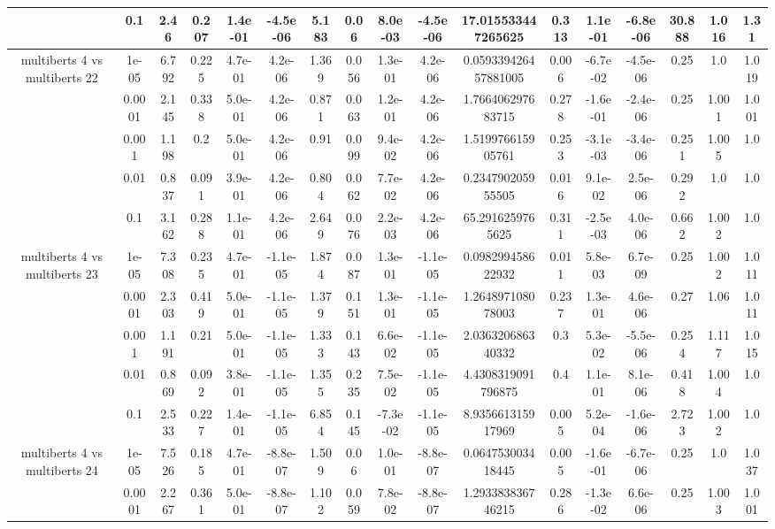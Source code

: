 \begin{tabular}{|c|c|c|c|c|c|c|c|c|c|c|c|c|c|c|c|c|}
 & 0.1 & 2.46 & 0.207 & 1.4e-01 & -4.5e-06 & 5.183 & 0.06 & 8.0e-03 & -4.5e-06 & 17.015533447265625 & 0.313 & 1.1e-01 & -6.8e-06 & 30.888 & 1.016 & 1.31 \\
\hline
\multirow{5}{*}{multiberts 4 vs multiberts 22} & 1e-05 & 6.792 & 0.225 & 4.7e-01 & 4.2e-06 & 1.369 & 0.056 & 1.3e-01 & 4.2e-06 & 0.059339426457881005 & 0.006 & -6.7e-02 & -4.5e-06 & 0.25 & 1.0 & 1.019 \\
 & 0.0001 & 2.145 & 0.338 & 5.0e-01 & 4.2e-06 & 0.871 & 0.063 & 1.2e-01 & 4.2e-06 & 1.766406297683715 & 0.278 & -1.6e-01 & -2.4e-06 & 0.25 & 1.001 & 1.001 \\
 & 0.001 & 1.198 & 0.2 & 5.0e-01 & 4.2e-06 & 0.91 & 0.099 & 9.4e-02 & 4.2e-06 & 1.519976615905761 & 0.253 & -3.1e-03 & -3.4e-06 & 0.251 & 1.005 & 1.0 \\
 & 0.01 & 0.837 & 0.091 & 3.9e-01 & 4.2e-06 & 0.804 & 0.062 & 7.7e-02 & 4.2e-06 & 0.234790205955505 & 0.016 & 9.1e-02 & 2.5e-06 & 0.292 & 1.0 & 1.0 \\
 & 0.1 & 3.162 & 0.288 & 1.1e-01 & 4.2e-06 & 2.649 & 0.076 & 2.2e-03 & 4.2e-06 & 65.2916259765625 & 0.311 & -2.5e-03 & 4.0e-06 & 0.662 & 1.002 & 1.0 \\
\hline
\multirow{5}{*}{multiberts 4 vs multiberts 23} & 1e-05 & 7.308 & 0.235 & 4.7e-01 & -1.1e-05 & 1.874 & 0.087 & 1.3e-01 & -1.1e-05 & 0.098299458622932 & 0.011 & 5.8e-03 & 6.7e-09 & 0.25 & 1.002 & 1.011 \\
 & 0.0001 & 2.303 & 0.419 & 5.0e-01 & -1.1e-05 & 1.379 & 0.151 & 1.3e-01 & -1.1e-05 & 1.264897108078003 & 0.237 & 1.3e-01 & 4.6e-06 & 0.27 & 1.06 & 1.011 \\
 & 0.001 & 1.191 & 0.21 & 5.0e-01 & -1.1e-05 & 1.333 & 0.143 & 6.6e-02 & -1.1e-05 & 2.036320686340332 & 0.3 & 5.3e-02 & -5.5e-06 & 0.254 & 1.117 & 1.015 \\
 & 0.01 & 0.869 & 0.092 & 3.8e-01 & -1.1e-05 & 1.355 & 0.235 & 7.5e-02 & -1.1e-05 & 4.4308319091796875 & 0.4 & 1.1e-01 & 8.1e-06 & 0.418 & 1.004 & 1.0 \\
 & 0.1 & 2.533 & 0.227 & 1.4e-01 & -1.1e-05 & 6.854 & 0.145 & -7.3e-02 & -1.1e-05 & 8.935661315917969 & 0.005 & 5.2e-04 & -1.6e-06 & 2.723 & 1.002 & 1.0 \\
\hline
\multirow{5}{*}{multiberts 4 vs multiberts 24} & 1e-05 & 7.526 & 0.185 & 4.7e-01 & -8.8e-07 & 1.509 & 0.06 & 1.0e-01 & -8.8e-07 & 0.064753003418445 & 0.005 & -1.6e-01 & -6.7e-06 & 0.25 & 1.0 & 1.037 \\
 & 0.0001 & 2.267 & 0.361 & 5.0e-01 & -8.8e-07 & 1.102 & 0.059 & 7.8e-02 & -8.8e-07 & 1.293383836746215 & 0.286 & -1.3e-02 & 6.6e-06 & 0.25 & 1.003 & 1.001 \\

\end{tabular}
